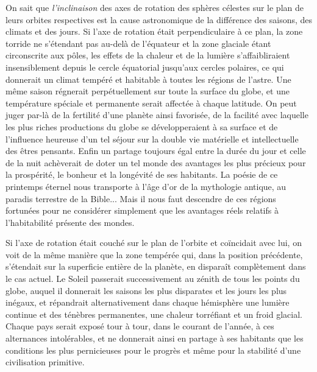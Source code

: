 \documentclass[a4paper, 11pt, oneside, landscape]{article}
\begin{document}
On sait que \emph{l'inclinaison} des axes de rotation des sphères célestes sur le plan de leurs orbites respectives est la cause astronomique de la différence des saisons, des climats et des jours. Si l'axe de rotation était perpendiculaire à ce plan, la zone torride ne s'étendant pas au-delà de l'équateur et la zone glaciale étant circonscrite aux pôles, les effets de la chaleur et de la lumière s'affaibliraient insensiblement depuis le cercle équatorial jusqu'aux cercles polaires, ce qui donnerait un climat tempéré et habitable à toutes les régions de l'astre. Une même saison régnerait perpétuellement sur toute la surface du globe, et une température spéciale et permanente serait affectée à chaque latitude. On peut juger par-là de la fertilité d'une planète ainsi favorisée, de la facilité avec laquelle les plus riches productions du globe se développeraient à sa surface et de l'influence heureuse d'un tel séjour sur la double vie matérielle et intellectuelle des êtres pensants. Enfin un partage toujours égal entre la durée du jour et celle de la nuit achèverait de doter un tel monde des avantages les plus précieux pour la prospérité, le bonheur et la longévité de ses habitants. La poésie de ce printemps éternel nous transporte à l'âge d'or de la mythologie antique, au paradis terrestre de la Bible... Mais il nous faut descendre de ces régions fortunées pour ne considérer simplement que les avantages réels relatifs à l'habitabilité présente des mondes.

Si l'axe de rotation était couché sur le plan de l'orbite et coïncidait avec lui, on voit de la même manière que la zone tempérée qui, dans la position précédente, s'étendait sur la superficie entière de la planète, en disparaît complètement dans le cas actuel. Le Soleil passerait successivement au zénith de tous les points du globe, auquel il donnerait les saisons les plus disparates et les jours les plus inégaux, et répandrait alternativement dans chaque hémisphère une lumière continue et des ténèbres permanentes, une chaleur torréfiant et un froid glacial. Chaque pays serait exposé tour à tour, dans le courant de l'année, à ces alternances intolérables, et ne donnerait ainsi en partage à ses habitants que les conditions les plus pernicieuses pour le progrès et même pour la stabilité d'une civilisation primitive.
\end{document}
